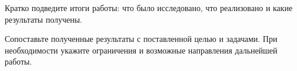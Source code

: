 \conclusion

Кратко подведите итоги работы: что было исследовано, что реализовано и какие результаты получены.

Сопоставьте полученные результаты с поставленной целью и задачами. При необходимости укажите ограничения и возможные направления дальнейшей работы.
